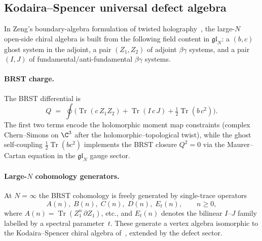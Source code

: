 \subsection{Kodaira--Spencer universal defect algebra}
\label{subsec:KS-defect}

In Zeng's boundary-algebra formulation of twisted holography~\cite{Zeng2024,CDG2023},
the large-$N$ open-side chiral algebra is built from the following field content
in $\mathfrak{gl}_N$: a $(b,c)$ ghost system in the adjoint,
a pair $(Z_1,Z_2)$ of adjoint $\beta\gamma$ systems, and
a pair $(I,J)$ of fundamental/anti-fundamental $\beta\gamma$ systems.

\paragraph{BRST charge.}
The BRST differential is
\[
 Q \;=\; \oint\!\bigl(\operatorname{Tr}(c\,Z_1 Z_2)
 + \operatorname{Tr}(I\,c\,J)
 + \tfrac{1}{2}\operatorname{Tr}(b\,c^2)\bigr).
\]
The first two terms encode the holomorphic moment map constraints
(complex Chern--Simons on $\C^3$ after the holomorphic--topological twist),
while the ghost self-coupling $\frac{1}{2}\operatorname{Tr}(bc^2)$
implements the BRST closure $Q^2=0$ via the Maurer--Cartan equation
in the $\mathfrak{gl}_N$ gauge sector.

\paragraph{Large-$N$ cohomology generators.}
At $N=\infty$ the BRST cohomology is freely generated by
single-trace operators
\[
 A(n),\; B(n),\; C(n),\; D(n),\; E_t(n),
 \qquad n \ge 0,
\]
where $A(n)=\operatorname{Tr}(Z_1^n\,\partial Z_1)$, etc., and $E_t(n)$
denotes the bilinear $I$--$J$ family labelled by a spectral parameter~$t$.
These generate a vertex algebra isomorphic to the Kodaira--Spencer
chiral algebra of~\cite{BCOV93}, extended by the defect sector.

